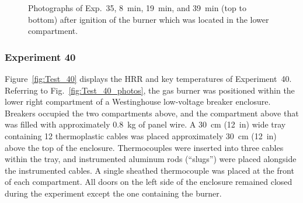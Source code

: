 \begin{figure}[p]
\caption[Photographs of Exp.~35]{Photographs of Exp.~35, 8~min, 19~min, and 39~min (top to bottom) after ignition of the burner which was located in the lower compartment.}
\label{fig:Test_35_photos}
\end{figure}


\clearpage

\subsubsection{Experiment 40}

Figure~\ref{fig:Test_40} displays the HRR and key temperatures of Experiment~40. Referring to Fig.~\ref{fig:Test_40_photos}, the gas burner was positioned within the lower right compartment of a Westinghouse low-voltage breaker enclosure. Breakers occupied the two compartments above, and the compartment above that was filled with approximately 0.8~kg of panel wire. A 30~cm (12~in) wide tray containing 12 thermoplastic cables was placed approximately 30~cm (12~in) above the top of the enclosure. Thermocouples were inserted into three cables within the tray, and instrumented aluminum rods (``slugs'') were placed alongside the instrumented cables. A single sheathed thermocouple was placed at the front of each compartment. All doors on the left side of the enclosure remained closed during the experiment except the one containing the burner.

